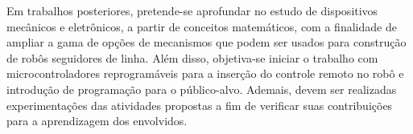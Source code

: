 \documentclass{textolivre-html}
\begin{document}
Em trabalhos posteriores, pretende-se aprofundar no estudo de dispositivos
mecânicos e eletrônicos, a partir de conceitos matemáticos, com a finalidade de
ampliar a gama de opções de mecanismos que podem ser usados para construção de
robôs seguidores de linha. Além disso, objetiva-se iniciar o trabalho com
microcontroladores reprogramáveis para a inserção do controle remoto no robô e
introdução de programação para o público-alvo. Ademais, devem ser realizadas
experimentações das atividades propostas a fim de verificar suas contribuições
para a aprendizagem dos envolvidos.


\printbibliography\label{sec-bib}
\end{document}
